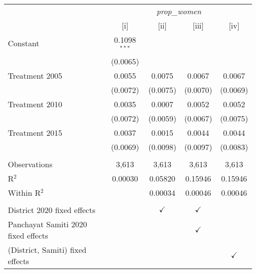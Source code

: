 
\begingroup
\centering
\begin{tabular}{lcccc}
   \toprule
    & \multicolumn{4}{c}{\textit{prop\_women}}\\
                                       & [i]            & [ii]          & [iii]         & [iv]\\  
   \midrule 
   Constant                            & 0.1098$^{***}$ &               &               &   \\   
                                       & (0.0065)       &               &               &   \\   
   Treatment 2005                      & 0.0055         & 0.0075        & 0.0067        & 0.0067\\   
                                       & (0.0072)       & (0.0075)      & (0.0070)      & (0.0069)\\   
   Treatment  2010                     & 0.0035         & 0.0007        & 0.0052        & 0.0052\\   
                                       & (0.0072)       & (0.0059)      & (0.0067)      & (0.0075)\\   
   Treatment 2015                      & 0.0037         & 0.0015        & 0.0044        & 0.0044\\   
                                       & (0.0069)       & (0.0098)      & (0.0097)      & (0.0083)\\   
    \\
   Observations                        & 3,613          & 3,613         & 3,613         & 3,613\\  
   R$^2$                               & 0.00030        & 0.05820       & 0.15946       & 0.15946\\  
   Within R$^2$                        &                & 0.00034       & 0.00046       & 0.00046\\  
    \\
   District 2020 fixed effects         &                & $\checkmark$  & $\checkmark$  & \\  
   Panchayat Samiti 2020 fixed effects &                &               & $\checkmark$  & \\  
   (District, Samiti) fixed effects    &                &               &               & $\checkmark$\\   
   \bottomrule
\end{tabular}
\par\endgroup


